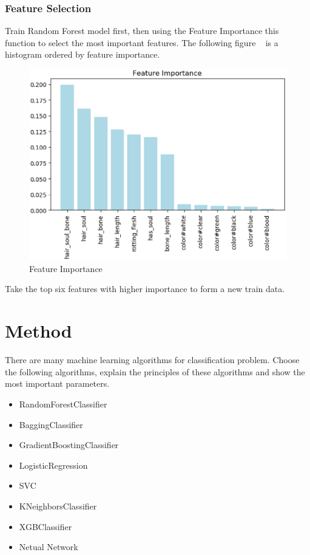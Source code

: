 \subsubsection{Feature Selection}


Train Random Forest model first, 
then using the Feature Importance this function 
to select the most important features. 
The following figure ~
is a histogram ordered by feature importance. 


\begin{figure}[htbp]
	\centering
	\includegraphics[scale=0.3]{figures/FEATURE.eps}
	\caption{Feature Importance}\label{fig:feature_importance}
\end{figure}

Take the top six features 
with higher importance 
to form a new train data.


\section{Method}

There are many machine learning algorithms 
for classification problem. 
Choose the following algorithms, 
explain the principles of
these algorithms and 
show the most important parameters.

\begin{itemize}
	\item RandomForestClassifier
	\item BaggingClassifier
	\item GradientBoostingClassifier
	\item LogisticRegression
	\item SVC
	\item KNeighborsClassifier 
	\item XGBClassifier
	\item Netual Network
\end{itemize}

